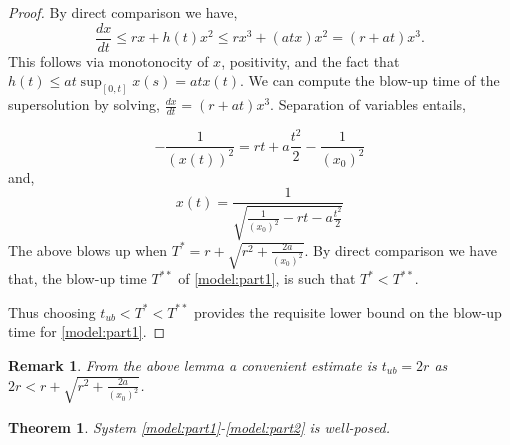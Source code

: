 \documentclass[sn-mathphys-num]{sn-jnl}
\newtheorem{theorem}{Theorem}[section]
\newtheorem{remark}{Remark}
\numberwithin{equation}{section}
\numberwithin{equation}{section}
\begin{document}
\begin{proof}
    By direct comparison we have,
    \begin{equation}
        \frac{dx}{dt} \leq rx + h(t) x^{2} \leq rx^{3} + (a t x)x^{2} = (r+at)x^{3}.
    \end{equation}
    This follows via monotonocity of $x$, positivity, and the fact that $h(t) \leq a t\sup_{[0,t]} x(s) = a t x(t)$.
    We can compute the blow-up time of the supersolution by solving, $\frac{dx}{dt} = (r+at)x^{3}$. Separation of variables entails,

    \begin{equation}
        -\frac{1}{(x(t))^{2}} = rt + a \frac{t^{2}}{2} -  \frac{1}{(x_{0})^{2}} 
    \end{equation}
    and,
     \begin{equation}
       x(t)= \frac{1}{\sqrt{\frac{1}{(x_{0})^{2}} - rt - a \frac{t^{2}}{2}}}
    \end{equation}
    The above blows up when $T^{*} = r + \sqrt{r^{2}+\frac{2a}{(x_{0})^{2}}}$.
    By direct comparison we have that, the blow-up time $T^{**}$ of \ref{model:part1}, is such that 
$T^{*} < T^{**}$.
    
    Thus choosing $t_{ub} < T^{*} < T^{**}$ provides the requisite lower bound on the blow-up time for \ref{model:part1}. 
\end{proof}
\begin{remark}
    From the above lemma a convenient estimate is $\boxed{t_{ub} = 2r}$ as $2r < r+\sqrt{r^{2}+\frac{2a}{(x_{0})^{2}}}$.
\end{remark}

\begin{theorem}
    System \ref{model:part1}-\ref{model:part2} is well-posed.
\end{theorem}
\end{document}
